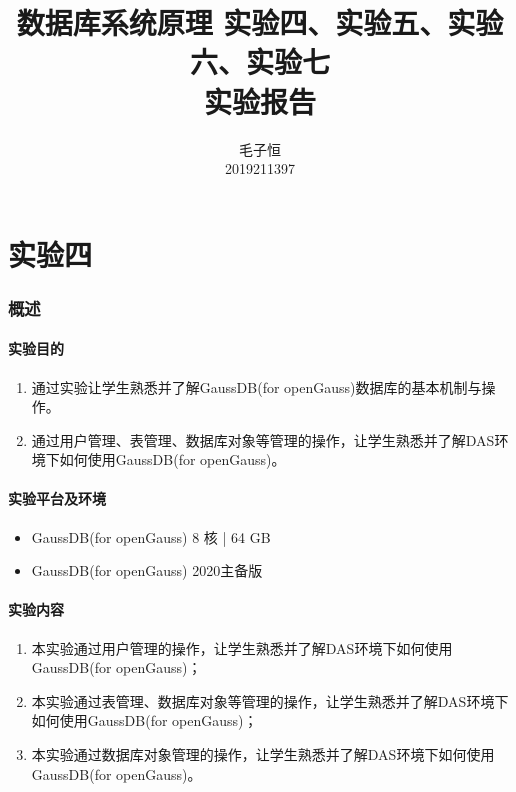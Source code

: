 \documentclass[lang=cn,11pt,a4paper,cite=authornum]{paper}
\title{数据库系统原理 实验四、实验五、实验六、实验七 \\ 实验报告}
\author{毛子恒 \\ 2019211397}
\institute{北京邮电大学\ 计算机学院}
\date{\zhtoday}
\begin{document}
\maketitle

\part{实验四}

\section{概述}

\subsection{实验目的}

\begin{enumerate}
    \item 通过实验让学生熟悉并了解GaussDB(for openGauss)数据库的基本机制与操作。
    \item 通过用户管理、表管理、数据库对象等管理的操作，让学生熟悉并了解DAS环境下如何使用GaussDB(for openGauss)。
\end{enumerate}

\subsection{实验平台及环境}

\begin{itemize}
    \item GaussDB(for openGauss) 8 核 | 64 GB
    \item GaussDB(for openGauss) 2020主备版
\end{itemize}

\subsection{实验内容}

\begin{enumerate}
    \item 本实验通过用户管理的操作，让学生熟悉并了解DAS环境下如何使用GaussDB(for openGauss)；
    \item 本实验通过表管理、数据库对象等管理的操作，让学生熟悉并了解DAS环境下如何使用GaussDB(for openGauss)；
    \item 本实验通过数据库对象管理的操作，让学生熟悉并了解DAS环境下如何使用GaussDB(for openGauss)。
\end{enumerate}
\end{document}
